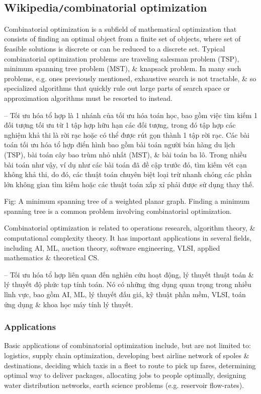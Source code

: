 \documentclass{article}
\begin{document}

\subsection{Wikipedia{\tt/}combinatorial optimization}
Combinatorial optimization is a subfield of mathematical optimization that consists of finding an optimal object from a finite set of objects, where set of feasible solutions is discrete or can be reduced to a discrete set. Typical combinatorial optimization problems are traveling salesman problem (TSP), minimum spanning tree problem (MST), \& knapsack problem. In many such problems, e.g. ones previously mentioned, exhaustive search is not tractable, \& so specialized algorithms that quickly rule out large parts of search space or approximation algorithms must be resorted to instead.

-- Tối ưu hóa tổ hợp là 1 nhánh của tối ưu hóa toán học, bao gồm việc tìm kiếm 1 đối tượng tối ưu từ 1 tập hợp hữu hạn các đối tượng, trong đó tập hợp các nghiệm khả thi là rời rạc hoặc có thể được rút gọn thành 1 tập rời rạc. Các bài toán tối ưu hóa tổ hợp điển hình bao gồm bài toán người bán hàng du lịch (TSP), bài toán cây bao trùm nhỏ nhất (MST), \& bài toán ba lô. Trong nhiều bài toán như vậy, ví dụ như các bài toán đã đề cập trước đó, tìm kiếm vét cạn không khả thi, do đó, các thuật toán chuyên biệt loại trừ nhanh chóng các phần lớn không gian tìm kiếm hoặc các thuật toán xấp xỉ phải được sử dụng thay thế.

{\sf Fig: A minimum spanning tree of a weighted planar graph. Finding a minimum spanning tree is a common problem involving combinatorial optimization.}

Combinatorial optimization is related to operations research, algorithm theory, \& computational complexity theory. It has important applications in several fields, including AI, ML, auction theory, software engineering, VLSI, applied mathematics \& theoretical CS.

-- Tối ưu hóa tổ hợp liên quan đến nghiên cứu hoạt động, lý thuyết thuật toán \& lý thuyết độ phức tạp tính toán. Nó có những ứng dụng quan trọng trong nhiều lĩnh vực, bao gồm AI, ML, lý thuyết đấu giá, kỹ thuật phần mềm, VLSI, toán ứng dụng \& khoa học máy tính lý thuyết.


\subsubsection{Applications}
Basic applications of combinatorial optimization include, but are not limited to: logistics, supply chain optimization, developing best airline network of spoles \& destinations, deciding which taxis in a fleet to route to pick up fares, determining optimal way to deliver packages, allocating jobs to people optimally, designing water distribution networks, earth science problems (e.g. reservoir flow-rates).
\end{document}
